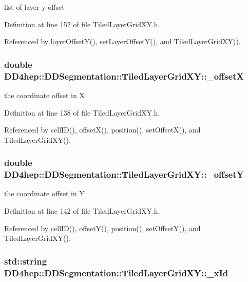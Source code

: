 list of layer y offset 

Definition at line 152 of file TiledLayerGridXY.h.

Referenced by layerOffsetY(), setLayerOffsetY(), and TiledLayerGridXY().\hypertarget{class_d_d4hep_1_1_d_d_segmentation_1_1_tiled_layer_grid_x_y_aa5658d900b004184ff4bd2160438bbeb}{
\subsubsection[{\_\-offsetX}]{\setlength{\rightskip}{0pt plus 5cm}double {\bf DD4hep::DDSegmentation::TiledLayerGridXY::\_\-offsetX}}}
\label{class_d_d4hep_1_1_d_d_segmentation_1_1_tiled_layer_grid_x_y_aa5658d900b004184ff4bd2160438bbeb}


the coordinate offset in X 

Definition at line 138 of file TiledLayerGridXY.h.

Referenced by cellID(), offsetX(), position(), setOffsetX(), and TiledLayerGridXY().\hypertarget{class_d_d4hep_1_1_d_d_segmentation_1_1_tiled_layer_grid_x_y_ab8f5e777f372e32435efd7d915217b79}{
\subsubsection[{\_\-offsetY}]{\setlength{\rightskip}{0pt plus 5cm}double {\bf DD4hep::DDSegmentation::TiledLayerGridXY::\_\-offsetY}}}
\label{class_d_d4hep_1_1_d_d_segmentation_1_1_tiled_layer_grid_x_y_ab8f5e777f372e32435efd7d915217b79}


the coordinate offset in Y 

Definition at line 142 of file TiledLayerGridXY.h.

Referenced by cellID(), offsetY(), position(), setOffsetY(), and TiledLayerGridXY().\hypertarget{class_d_d4hep_1_1_d_d_segmentation_1_1_tiled_layer_grid_x_y_a55a6c20f981c68d6fbb3bbc8823ff770}{
\subsubsection[{\_\-xId}]{\setlength{\rightskip}{0pt plus 5cm}std::string {\bf DD4hep::DDSegmentation::TiledLayerGridXY::\_\-xId}}}
\label{class_d_d4hep_1_1_d_d_segmentation_1_1_tiled_layer_grid_x_y_a55a6c20f981c68d6fbb3bbc8823ff770}



